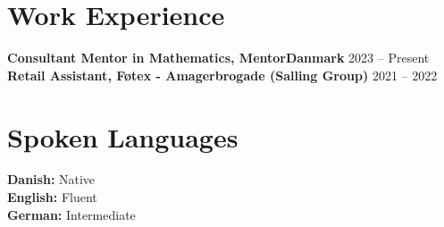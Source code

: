 \documentclass[a4paper,11.5pt]{article}
\begin{document}
\section*{Work Experience}
\textbf{Consultant Mentor in Mathematics, MentorDanmark} \hfill 2023 -- Present \\
\textbf{Retail Assistant, F\o tex - Amagerbrogade (Salling Group)} \hfill 2021 -- 2022

\section*{Spoken Languages}
\textbf{Danish:} Native \\
\textbf{English:} Fluent \\
\textbf{German:} Intermediate
\end{document}
